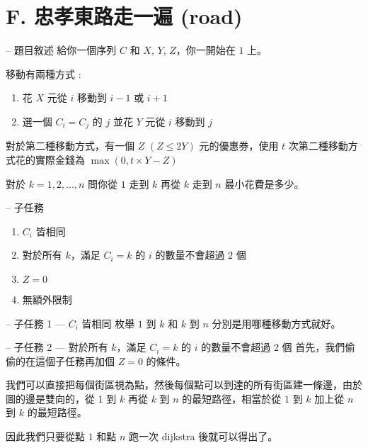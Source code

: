 \documentclass[hyperref,UTF8,notheorems,xcolor={dvipsnames}]{beamer}
\newcommand{\btitle}[1]{{\secname} -- #1}
\theoremstyle{definition}
\begin{document}
\section{F. 忠孝東路走一遍 (road)}

\begin{frame}[fragile]{\btitle{題目敘述}}
	給你一個序列 $C$ 和 $X$, $Y$, $Z$，你一開始在 $1$ 上。

	移動有兩種方式 : 

	\begin{enumerate}
		\item 花 $X$ 元從 $i$ 移動到 $i - 1$ 或 $i + 1$ \\
		\item 選一個 $C_i = C_j$ 的 $j$ 並花 $Y$ 元從 $i$ 移動到 $j$
	\end{enumerate}

	對於第二種移動方式，有一個 $Z$ $(Z \le 2 Y)$ 元的優惠券，使用 $t$ 次第二種移動方式花的實際金錢為 $\max(0, t \times Y - Z)$

	對於 $k = 1, 2, ..., n$ 問你從 $1$ 走到 $k$ 再從 $k$ 走到 $n$ 最小花費是多少。
\end{frame}

\begin{frame}[fragile]{\btitle{子任務}}
	\begin{enumerate}
		\item $C_i$ 皆相同
		\item 對於所有 $k$，滿足 $C_i = k$ 的 $i$ 的數量不會超過 $2$ 個
		\item $Z = 0$
		\item 無額外限制
	\end{enumerate}
\end{frame}

\begin{frame}[fragile]{\btitle{子任務 1 --- $C_i$ 皆相同}}
	枚舉 $1$ 到 $k$ 和 $k$ 到 $n$ 分別是用哪種移動方式就好。
\end{frame}

\begin{frame}[fragile]{\btitle{子任務 2 --- 對於所有 $k$，滿足 $C_i = k$ 的 $i$ 的數量不會超過 $2$ 個}}
	首先，我們偷偷的在這個子任務再加個 $Z = 0$ 的條件。

	我們可以直接把每個街區視為點，然後每個點可以到達的所有街區建一條邊，由於圖的邊是雙向的，從 $1$ 到 $k$ 再從 $k$ 到 $n$ 的最短路徑，相當於從 $1$ 到 $k$ 加上從 $n$ 到 $k$ 的最短路徑。
	
	因此我們只要從點 $1$ 和點 $n$ 跑一次 dijkstra 後就可以得出了。
\end{frame}
\end{document}
